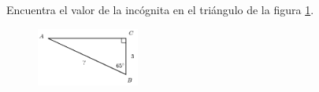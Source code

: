\question[15]  Encuentra el valor de la incógnita en el triángulo de la figura \ref{fig:lados_functrig_16}.
\begin{figure}[H]
    \begin{center}
        \includegraphics[width=0.3\textwidth]{../images/lados_functrig_16.png}
    \end{center}
    \caption{}
    \label{fig:lados_functrig_16}
\end{figure}